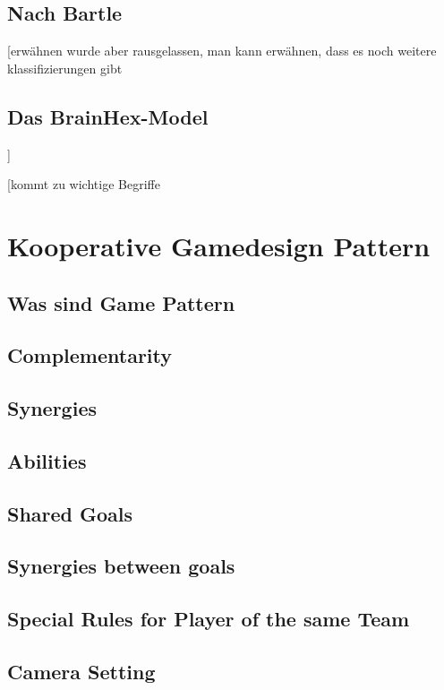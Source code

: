 \subsection{Nach Bartle}
\cite{bartle_hearts_nodate}

[erwähnen wurde aber rausgelassen, man kann erwähnen, dass es noch weitere klassifizierungen gibt
\subsection{Das BrainHex-Model}
\cite{nacke_brainhex_2014}
]

[kommt zu wichtige Begriffe
\section{Kooperative Gamedesign Pattern}
\subsection{Was sind Game Pattern}
\cite{bjork_patterns_2005}

\subsection{Complementarity}

\subsection{Synergies}

\subsection{Abilities}

\subsection{Shared Goals}

\subsection{Synergies between goals}

\subsection{Special Rules for Player of the same Team}

\subsection{Camera Setting}

